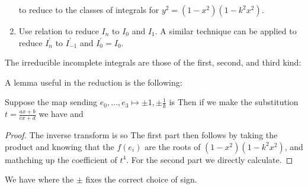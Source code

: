 \documentclass{article}
\begin{document}
\begin{enumerate}
to reduce to the classes of integrals
for $y^2 = (1-x^2)(1-k^2 x^2)$.
\item Use relation 
to reduce $I_n$ to $I_0$ and $I_1$. A similar technique can be applied to reduce $I_n^\prime$ to $I_{-1}^\prime$ and $I_0^\prime=I_0$. 
\end{enumerate}

\begin{idea}
	The irreducible incomplete integrals are those of the first, second, and third kind:
\end{idea}

A lemma useful in the reduction is the following:
\begin{prop}
	Suppose the map sending $e_0, \dots, e_3 \mapsto \pm 1, \pm \frac{1}{k}$ is 
Then if we make the substitution $t = \frac{ax+b}{cx+d}$ we have 
and 
\end{prop}
\begin{proof}
The inverse transform is 
so 
The first part then follows by taking the product and knowing that the $f(e_i)$ are the roots of $(1-x^2)(1-k^2x^2)$, and mathching up the coefficient of $t^4$. For the second part we directly calculate. 
\end{proof}

\begin{corollary}
	We have
where the $\pm$ fixes the correct choice of sign. 
\end{corollary}
\end{document}
